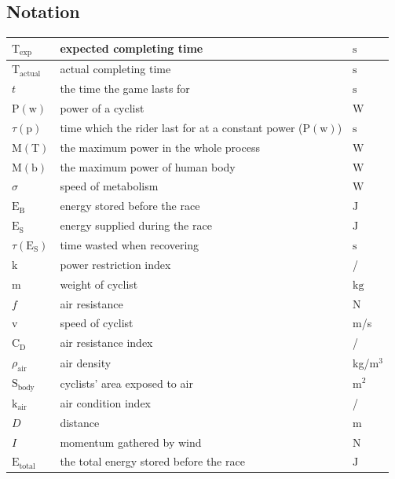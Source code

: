 \documentclass[14pt]{article}
\begin{document}
	\subsection{Notation}	
	\begin{tabular}{|l|l|l|}
		\hline
		$\mathrm{T}_\mathrm{exp}$&expected completing time&$\mathrm{s}$\\
		\hline
		$\mathrm{T}_\mathrm{actual}$&actual completing time&$\mathrm{s}$\\
		\hline
		$t$&the time the game lasts for&$\mathrm{s}$\\
		\hline
		$\mathrm{P}(\mathrm{w})$&power of a cyclist&W\\
		\hline
		$\tau(\mathrm{p})$&time which the rider last for at a constant power ($\mathrm{P}(\mathrm{w})$)&$\mathrm{s}$\\
		\hline
		$\mathrm{M}(\mathrm{T})$&the maximum power in the whole process&$\mathrm{W}$\\
		\hline
		$\mathrm{M}(\mathrm{b})$&the maximum power of human body&$\mathrm{W}$\\
		\hline
		$\sigma$&speed of metabolism&$\mathrm{W}$\\ 
		\hline
		$\mathrm{E}_\mathrm{B}$&energy stored before the race&$\mathrm{J}$\\ 
		\hline
		$\mathrm{E}_\mathrm{S}$&energy supplied during the race&$\mathrm{J}$\\ 
		\hline
		$\tau(\mathrm{E}_\mathrm{S})$&time wasted when recovering&$\mathrm{s}$\\ 
		\hline
		$\mathrm{k}$&power restriction index&/\\ 
		\hline
		$\mathrm{m}$&weight of cyclist&$\mathrm{kg}$\\
		\hline
		$f$&air resistance&$\mathrm{N}$\\ 
		\hline
		$\mathrm{v}$&speed of cyclist&m/s\\ 
		\hline
		$\mathrm{C}_\mathrm{D}$&air resistance index&/\\ 
		\hline
		$\rho_\mathrm{air}$&air density&kg/$\mathrm{m}^3$\\ 
		\hline
		$\mathrm{S}_\mathrm{body}$&cyclists' area exposed to air&$\mathrm{m}^2$\\ 
		\hline
		$\mathrm{k}_\mathrm{air}$&air condition index&/\\ 
		\hline
		$D$&distance&m\\
		\hline
		$I$&momentum gathered by wind&$\mathrm{N}$\\ 
		\hline
		$\mathrm{E}_\mathrm{total}$&the total energy stored before the race&$\mathrm{J}$\\ 
		\hline
	\end{tabular}
\end{document}
